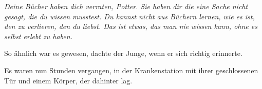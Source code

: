 \emph{Deine Bücher haben dich verraten, Potter. Sie haben dir die eine Sache nicht gesagt, die du wissen musstest. Du kannst nicht aus Büchern lernen, wie es ist, den zu verlieren, den du liebst. Das ist etwas, das man nie wissen kann, ohne es selbst erlebt zu haben.}

So ähnlich war es gewesen, dachte der Junge, wenn er sich richtig erinnerte.

\later

Es waren nun Stunden vergangen, in der Krankenstation mit ihrer geschlossenen Tür und einem Körper, der dahinter lag.


